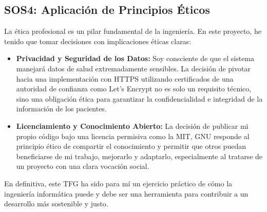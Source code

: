 \subsection{SOS4: Aplicación de Principios Éticos}
La ética profesional es un pilar fundamental de la ingeniería. En este proyecto, he tenido que tomar decisiones con implicaciones éticas claras:
\begin{itemize}
    \item \textbf{Privacidad y Seguridad de los Datos:} Soy consciente de que el sistema manejará datos de salud extremadamente sensibles. La decisión de pivotar hacia una implementación con HTTPS utilizando certificados de una autoridad de confianza como Let's Encrypt no es solo un requisito técnico, sino una obligación ética para garantizar la confidencialidad e integridad de la información de los pacientes.
    \item \textbf{Licenciamiento y Conocimiento Abierto:} La decisión de publicar mi propio código bajo una licencia permisiva como la MIT, GNU responde al principio ético de compartir el conocimiento y permitir que otros puedan beneficiarse de mi trabajo, mejorarlo y adaptarlo, especialmente al tratarse de un proyecto con una clara vocación social.
\end{itemize}
En definitiva, este TFG ha sido para mí un ejercicio práctico de cómo la ingeniería informática puede y debe ser una herramienta para contribuir a un desarrollo más sostenible y justo.